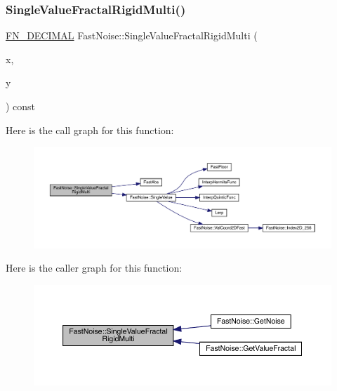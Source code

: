 \subsubsection{\texorpdfstring{Single\+Value\+Fractal\+Rigid\+Multi()}{SingleValueFractalRigidMulti()}\hspace{0.1cm}{\footnotesize\ttfamily [1/2]}}
{\footnotesize\ttfamily \mbox{\hyperlink{_fast_noise_8h_a75a9ef6d2541c4921815b885bfd449c3}{F\+N\+\_\+\+D\+E\+C\+I\+M\+AL}} Fast\+Noise\+::\+Single\+Value\+Fractal\+Rigid\+Multi (\begin{DoxyParamCaption}\item[{\mbox{\hyperlink{_fast_noise_8h_a75a9ef6d2541c4921815b885bfd449c3}{F\+N\+\_\+\+D\+E\+C\+I\+M\+AL}}}]{x,  }\item[{\mbox{\hyperlink{_fast_noise_8h_a75a9ef6d2541c4921815b885bfd449c3}{F\+N\+\_\+\+D\+E\+C\+I\+M\+AL}}}]{y }\end{DoxyParamCaption}) const\hspace{0.3cm}{\ttfamily [private]}}

Here is the call graph for this function\+:
\nopagebreak
\begin{figure}[H]
\begin{center}
\leavevmode
\includegraphics[width=350pt]{d1/dd8/class_fast_noise_a9061e8fb70914a8aa976d861d21a4f63_cgraph}
\end{center}
\end{figure}
Here is the caller graph for this function\+:
\nopagebreak
\begin{figure}[H]
\begin{center}
\leavevmode
\includegraphics[width=350pt]{d1/dd8/class_fast_noise_a9061e8fb70914a8aa976d861d21a4f63_icgraph}
\end{center}
\end{figure}
\mbox{\label{class_fast_noise_a252117bcf7130247e06fa0bd1695c41e}} 

